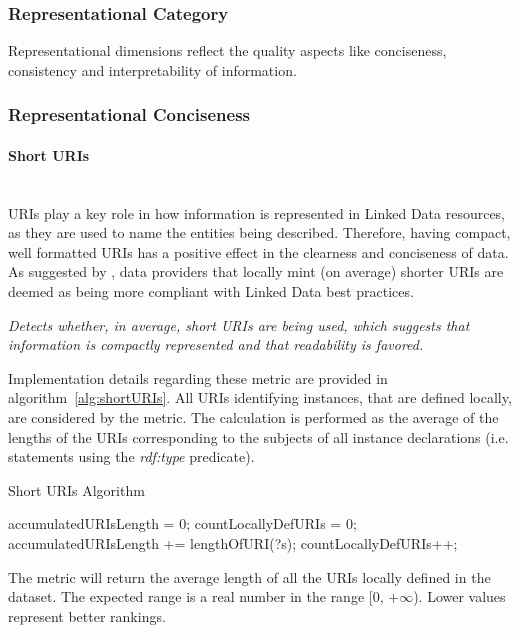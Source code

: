 
\subsubsection{Representational Category}
\label{sec:Representational} 

Representational dimensions reflect the quality aspects like conciseness, consistency and interpretability of information.

\subsubsection{Representational Conciseness}

\paragraph{Short URIs} ~\\
URIs play a key role in how information is represented in Linked Data resources, as they are used to name the entities being described. Therefore, having compact, well formatted URIs has a positive effect in the clearness and conciseness of data. 
As suggested by \cite{Hogan2012}, data providers that locally mint (on average) shorter URIs are deemed as being more compliant with Linked Data best practices.

\begin{mdframed}[style=metricdefinition]
\emph{Detects whether, in average, short URIs are being used, which suggests that information is compactly represented and that readability is favored.}
\end{mdframed}

Implementation details regarding these metric are provided in algorithm~\ref{alg:shortURIs}. All URIs identifying instances, that are defined locally, are considered by the metric. The calculation is performed as the average of the lengths of the URIs corresponding to the subjects of all instance declarations (i.e. statements using the \textit{rdf:type} predicate).
\begin{algorithm}
\caption{Short URIs Algorithm} \label{alg:shortURIs}
\begin{algorithmic}[1]
\State accumulatedURIsLength = 0;
\State countLocallyDefURIs = 0;
\EndProcedure
{}
\State accumulatedURIsLength += lengthOfURI(?s);
\State countLocallyDefURIs++;
\EndIf ~\\
\EndProcedure
\end{algorithmic}
\end{algorithm}
The metric will return the average length of all the URIs locally defined in the dataset. The expected range is a real number in the range [0, $+\infty$). Lower values represent better rankings.

